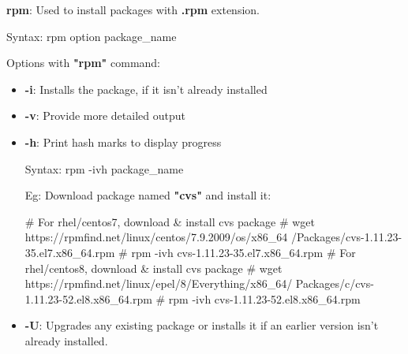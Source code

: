 \setlength{\columnsep}{3pt}
\begin{flushleft}
	\textbf{rpm}: Used to install packages with \textbf{.rpm} extension.
	\begin{tcolorbox}[breakable,notitle,boxrule=-0pt,colback=pink,colframe=pink]
		\color{black}
		\font=9pt
		Syntax: rpm option package\_name
		\font=4pt
	\end{tcolorbox}

	Options with \textbf{"rpm"} command:
	\begin{itemize}
		\item \textbf{-i}: Installs the package, if it isn't already installed
		\item \textbf{-v}: Provide more detailed output
		\item \textbf{-h}: Print hash marks to display progress
		\begin{tcolorbox}[breakable,notitle,boxrule=-0pt,colback=pink,colframe=pink]
			\color{black}
			\font=9pt
			Syntax: rpm -ivh package\_name
			\font=4pt
		\end{tcolorbox}
		Eg: Download package named \textbf{"cvs"} and install it:
		\bigskip
		\begin{tcolorbox}[breakable,notitle,boxrule=-0pt,colback=black,colframe=black]
			\color{yellow}
			\font=9pt
			\# For rhel/centos7, download \& install cvs package
			\newline
			\color{green}
			\# wget https://rpmfind.net/linux/centos/7.9.2009/os/x86\_64
			/Packages/cvs-1.11.23-35.el7.x86\_64.rpm
			\newline
			\# rpm -ivh cvs-1.11.23-35.el7.x86\_64.rpm
			\newline
			\newline
			\color{yellow}
			\font=9pt
			\# For rhel/centos8, download \& install cvs package
			\color{green}
			\newline
			\# wget https://rpmfind.net/linux/epel/8/Everything/x86\_64/
			Packages/c/cvs-1.11.23-52.el8.x86\_64.rpm
			\newline
			\# rpm -ivh cvs-1.11.23-52.el8.x86\_64.rpm 
			\font=4pt
		\end{tcolorbox}
		\bigskip
		\bigskip
		\item \textbf{-U}: Upgrades any existing package or installs it if an earlier version
		isn't already installed.
		\begin{tcolorbox}[breakable,notitle,boxrule=-0pt,colback=pink,colframe=pink]
			\color{black}
			\font=9pt

\end{tcolorbox}
\end{itemize}
\end{flushleft}
